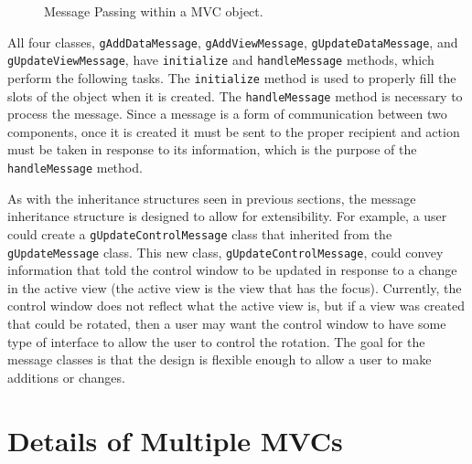 \documentclass{article}[11pt]
\newcommand{\Rfunction}[1]{{\texttt{#1}}}
\newcommand{\Robject}[1]{{\texttt{#1}}}
\begin{document}
\begin{figure}[ht]
  \begin{center}
    \caption{ Message Passing within a MVC object. }
    \label{Fig:MPwithin}
  \end{center}
\end{figure}

All four classes, \Robject{gAddDataMessage}, \Robject{gAddViewMessage},
\Robject{gUpdateDataMessage}, and \Robject{gUpdateViewMessage}, have
\Rfunction{initialize} and \Rfunction{handleMessage} methods, which perform
the following tasks.  The \Rfunction{initialize} method is used to properly
fill the slots of the object when it is created.  The
\Rfunction{handleMessage} method is necessary to process the message.  Since a
message is a form of communication between two components, once it is created
it must be sent to the proper recipient and action must be taken in response
to its information, which is the purpose of the \Rfunction{handleMessage}
method. 

As with the inheritance structures seen in previous sections, the message
inheritance structure is designed to allow for extensibility.  For example, a
user could create a \Robject{gUpdateControlMessage} class that inherited from
the \Robject{gUpdateMessage} class.  This new class,
\Robject{gUpdateControlMessage}, could convey information that told the
control window to be updated in response to a change in the active view (the
active view is the view that has the focus).  Currently, the control window
does not reflect what the active view is, but if a view was created that could
be rotated, then a user may want the control window to have some type of
interface to allow the user to control the rotation.  The goal for the message
classes is that the design is flexible enough to allow a user to make
additions or changes. 

\section{Details of Multiple MVCs}\label{Sec:MultMVC}
\end{document}

